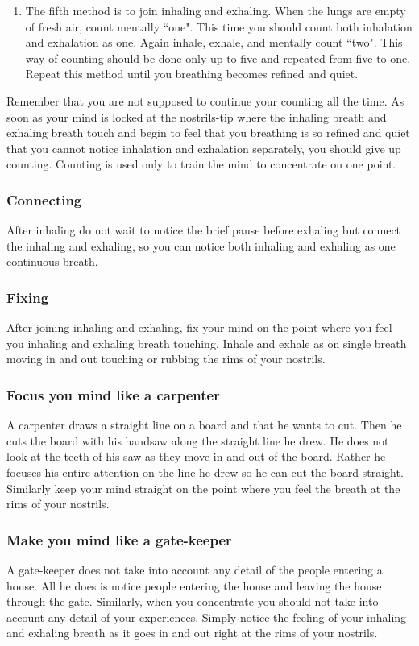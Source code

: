 \begin{enumerate}
\item The fifth method is to join inhaling and exhaling. When the lungs are empty
of fresh air, count mentally ``one". This time you should count both inhalation
and exhalation as one. Again inhale, exhale, and mentally count ``two". This way
of counting should be done only up to five and repeated from five to one. Repeat
this method until you breathing becomes refined and quiet.
\end{enumerate}

Remember that you are not supposed to continue your counting all the time. As
soon as your mind is locked at the nostrils-tip where the inhaling breath and
exhaling breath touch and begin to feel that you breathing is so refined and
quiet that you cannot notice inhalation and exhalation separately, you should
give up counting. Counting is used only to train the mind to concentrate on one
point.


\subsubsection*{Connecting} After inhaling do not wait to notice the brief pause before
exhaling but connect the inhaling and exhaling, so you can notice both inhaling
and exhaling as one continuous breath.

\subsubsection*{Fixing} After joining inhaling and exhaling, fix your mind on the point where
you feel you inhaling and exhaling breath touching. Inhale and exhale as on
single breath moving in and out touching or rubbing the rims of your nostrils.

\subsubsection*{Focus you mind like a carpenter} A carpenter draws a straight line on a board
and that he wants to cut. Then he cuts the board with his handsaw along the
straight line he drew. He does not look at the teeth of his saw as they move in
and out of the board. Rather he focuses his entire attention on the line he drew
so he can cut the board straight. Similarly keep your mind straight on the point
where you feel the breath at the rims of your nostrils.

\subsubsection*{Make you mind like a gate-keeper} A gate-keeper does not take into account any
detail of the people entering a house. All he does is notice people entering the
house and leaving the house through the gate. Similarly, when you concentrate
you should not take into account any detail of your experiences. Simply notice
the feeling of your inhaling and exhaling breath as it goes in and out right at
the rims of your nostrils.

